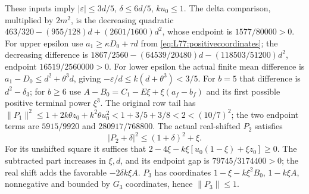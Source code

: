 These inputs imply
$|\varepsilon|\le3d/5$, $\delta\le6d/5$, $ku_0\le1$.
The delta comparison, multiplied by $2m^2$, is the decreasing
quadratic $463/320-(955/128)d+(2601/1600)d^2$, whose endpoint is
$1577/80000>0$.
For upper epsilon use $a_1\ge\kappa D_0+\tau d$ from
\eqref{eq:L77:positivecoordinates}; the decreasing difference is
$1867/2560-(64539/20480)d-(118503/51200)d^2$, endpoint
$16519/2560000>0$.
For lower epsilon the actual finite mean difference is
$a_1-D_0\le d^2+\theta^3d$, giving $-\varepsilon/d\le k(d+\theta^3)<3/5$.
For $b=5$ that difference is $d^2-\delta_3$; for $b\ge6$ use
$A-B_0=C_1-E\xi+\xi(a_f-b_f)$ and its first possible positive
terminal power $\xi^3$.
The original row tail has
$\|P_1\|^2\le1+2k\theta z_0+k^2\theta u_0^2
<1+3/5+3/8<2<(10/7)^2$;
the two endpoint terms are $5915/9920$ and $280917/768800$.
The actual real-shifted $P_2$ satisfies
\begin{equation}\tag{L77.4.3}\label{eq:L77:shiftedPtwo}
|P_2+\delta|^2\le(1+\delta)^2+\xi.
\end{equation}
For its unshifted square it suffices that
$2-4\xi-k\xi[u_0(1-\xi)+\xi z_0]\ge0$.
The subtracted part increases in $\xi,d$, and its endpoint gap is
$79745/3174400>0$; the real shift adds the favorable
$-2\delta k\xi A$.
$P_3$ has coordinates $1-\xi-k\xi^2B_0$, $1-k\xi A$,
nonnegative and bounded by $G_3$ coordinates, hence $\|P_3\|\le1$.

